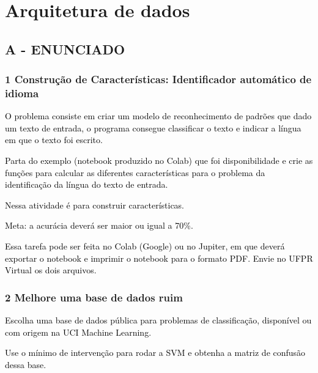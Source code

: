 \label{ap:ap06}
\chapter{Arquitetura de dados}
\section*{\textbf{A - ENUNCIADO}}


\subsection*{\textbf{1 Construção de Características: Identificador automático de idioma}}

\textcolor{black}{O problema consiste em criar um modelo de reconhecimento de padrões que dado um texto de entrada, o
programa consegue classificar o texto e indicar a língua em que o texto foi escrito.}



\textcolor{black}{Parta do exemplo (notebook produzido no Colab) que foi disponibilidade e crie as funções para calcular
as diferentes características para o problema da identificação da língua do texto de entrada.}



\textcolor{black}{Nessa atividade é para {\textquotedbl}construir características{\textquotedbl}.}



\textcolor{black}{Meta: a acurácia deverá ser maior ou igual a 70\%.}



\textcolor{black}{Essa tarefa pode ser feita no Colab (Google) ou no Jupiter, em que deverá exportar o notebook e
imprimir o notebook para o formato PDF. Envie no UFPR Virtual os dois arquivos.}



\subsection*{\textbf{2 Melhore uma base de dados ruim}}



\textcolor{black}{Escolha uma base de dados pública para problemas de classificação, disponível ou com origem na UCI
Machine Learning.}



\textcolor{black}{Use o mínimo de intervenção para rodar a SVM e obtenha a matriz de confusão dessa base.}



